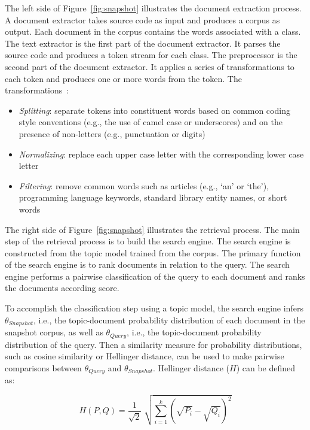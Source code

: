 The left side of Figure~\ref{fig:snapshot} illustrates the document extraction process.
A document extractor takes source code as input and produces a corpus as output.
Each document in the corpus contains the words associated with a class.
The text extractor is the first part of the document extractor.
It parses the source code and produces a token stream for each class.
The preprocessor is the second part of the document extractor.
It applies a series of transformations to each token and
produces one or more words from the token.
The transformations~\cite{Marcus-etal:2004,Marcus-Menzies:2010}: %
\begin{itemize}
    \item {\it Splitting}: separate tokens into constituent words
        based on common coding style conventions (e.g., the use of camel case or underscores)
        and on the presence of non-letters (e.g., punctuation or digits)
    \item {\it Normalizing}: replace each upper case letter with the corresponding
        lower case letter \item {\it Filtering}: remove common words such as
        articles (e.g., `an' or `the'),
        programming language keywords, standard library entity names, or short words
\end{itemize}

The right side of Figure~\ref{fig:snapshot} illustrates the retrieval process.
The main step of the retrieval process is to build the search engine.
The search engine is constructed from the topic model trained from the corpus.
The primary function of the search engine is to rank documents in relation to the query.
The search engine performs a pairwise classification of the query
to each document and ranks the documents according score.

To accomplish the classification step using a topic model,
the search engine infers $\theta_{Snapshot}$, i.e.,
the topic-document probability distribution of each document in the snapshot corpus,
as well as $\theta_{Query}$, i.e., the topic-document probability distribution  of the query.
Then a similarity measure for probability distributions, such as 
cosine similarity or Hellinger distance, can be used to make pairwise comparisons
between $\theta_{Query}$ and $\theta_{Snapshot}$.
Hellinger distance ($H$) can be defined as:

\begin{equation}
    H(P, Q) = \frac{1}{\sqrt{2}} \; \sqrt{\sum_{i=1}^{k} (\sqrt{P_i} - \sqrt{Q_i})^2}
\end{equation}


